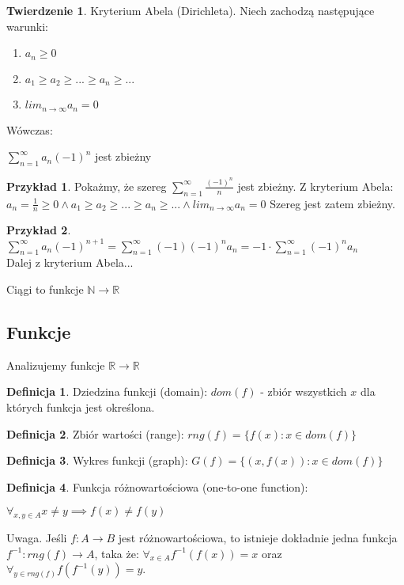 \documentclass{article}
\theoremstyle{definition}
\newtheorem{de}{Definicja}[subsection]
\theoremstyle{definition}
\newtheorem{tw}{Twierdzenie}[subsection]
\theoremstyle{definition}
\newtheorem{pk}{Przykład}[subsection]
\theoremstyle{definition}
\begin{document}
\begin{tw}
    Kryterium Abela (Dirichleta). Niech zachodzą następujące warunki:
    \begin{enumerate}
        \item $a_n\geq 0$
        \item $a_1\geq a_2\geq ... \geq a_n \geq ...$
        \item $lim_{n\rightarrow\infty} a_n = 0$
    \end{enumerate}
    Wówczas:
    \begin{center}
        $\sum_{n=1}^{\infty} a_n(-1)^n$ jest zbieżny
    \end{center}
\end{tw}

\begin{pk}
    Pokażmy, że szereg $\sum_{n=1}^{\infty} \frac{(-1)^n}{n}$ jest zbieżny. Z kryterium Abela:\\
    $a_n=\frac{1}{n}\geq 0 \land a_1\geq a_2\geq ... \geq a_n \geq ... \land lim_{n\rightarrow\infty} a_n = 0$
    Szereg jest zatem zbieżny.
\end{pk}

\begin{pk}
    $\sum_{n=1}^{\infty} a_n (-1)^{n+1}= \sum_{n=1}^{\infty} (-1)(-1)^n a_n = -1 \cdot \sum_{n=1}^{\infty} (-1)^n a_n$\\
    Dalej z kryterium Abela...
\end{pk}

Ciągi to funkcje $\mathbb{N}\rightarrow\mathbb{R}$

\subsection{Funkcje}

Analizujemy funkcje $\mathbb{R}\rightarrow\mathbb{R}$

\begin{de}
    Dziedzina funkcji (domain): $dom(f)$ - zbiór wszystkich $x$ dla których funkcja jest określona.
\end{de}

\begin{de}
    Zbiór wartości (range): $rng(f) = \{f(x): x\in dom(f)\}$
\end{de}

\begin{de}
    Wykres funkcji (graph): $G(f) = \{(x,f(x)): x\in dom(f)\}$
\end{de}

\begin{de}
    Funkcja różnowartościowa (one-to-one function):
    \begin{center}
         $\forall_{x,y\in A} x\neq y \implies f(x)\neq f(y)$
    \end{center}
    Uwaga. Jeśli $f: A\rightarrow B$ jest różnowartościowa, to istnieje dokładnie jedna funkcja\\ $f^{-1}: rng(f)\rightarrow A$, taka że:
    $\forall_{x\in A} f^{-1}(f(x))=x$ oraz $\forall_{y\in rng(f)} f(f^{-1}(y))=y$.
\end{de}
\end{document}
